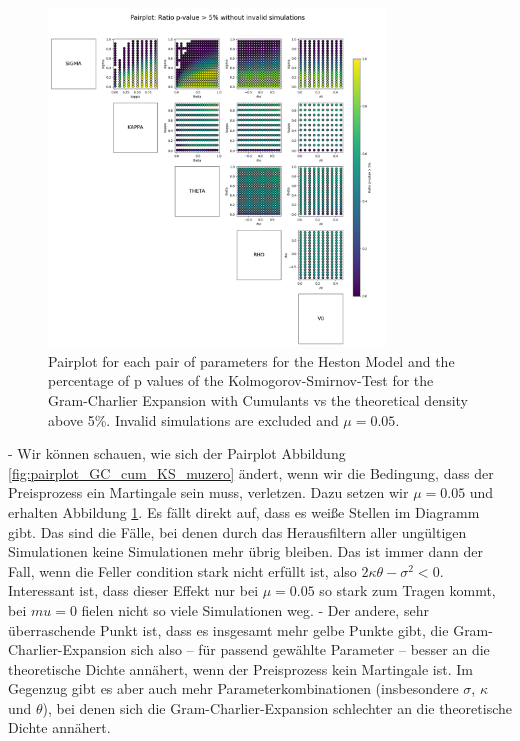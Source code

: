 \begin{figure}
    \centering
    \includegraphics[width=0.8\textwidth]{img/pairplot_GC_cum_KS.png}
    \caption{Pairplot for each pair of parameters for the Heston Model and the percentage of p values of the Kolmogorov-Smirnov-Test for the Gram-Charlier Expansion with Cumulants vs the theoretical density above 5\%. Invalid simulations are excluded and $\mu=0.05$.}
    \label{fig:pairplot_GC_cum_KS_mu005}
\end{figure}

- Wir können schauen, wie sich der Pairplot Abbildung \ref{fig:pairplot_GC_cum_KS_muzero} ändert, wenn wir die Bedingung, dass der Preisprozess ein Martingale sein muss, verletzen. Dazu setzen wir $\mu=0.05$ und erhalten Abbildung \ref{fig:pairplot_GC_cum_KS_mu005}. Es fällt direkt auf, dass es weiße Stellen im Diagramm gibt. Das sind die Fälle, bei denen durch das Herausfiltern aller ungültigen Simulationen keine Simulationen mehr übrig bleiben. Das ist immer dann der Fall, wenn die Feller condition stark nicht erfüllt ist, also $2\kappa\theta - \sigma^2 <0$. Interessant ist, dass dieser Effekt nur bei $\mu=0.05$ so stark zum Tragen kommt, bei $mu=0$ fielen nicht so viele Simulationen weg.
- Der andere, sehr überraschende Punkt ist, dass es insgesamt mehr gelbe Punkte gibt, die Gram-Charlier-Expansion sich also -- für passend gewählte Parameter -- besser an die theoretische Dichte annähert, wenn der Preisprozess kein Martingale ist. Im Gegenzug gibt es aber auch mehr Parameterkombinationen (insbesondere $\sigma$, $\kappa$ und $\theta$), bei denen sich die Gram-Charlier-Expansion schlechter an die theoretische Dichte annähert.

